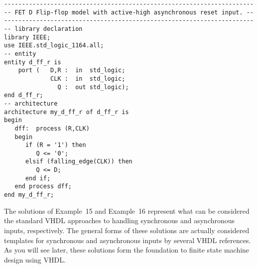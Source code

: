 \noindent
\begin{minipage}{0.99\linewidth}
\begin{lstlisting}[label=exe_16, caption=Solution to Example~16.]
----------------------------------------------------------------------
-- FET D Flip-flop model with active-high asynchronous reset input. --
----------------------------------------------------------------------
-- library declaration
library IEEE;
use IEEE.std_logic_1164.all;
-- entity
entity d_ff_r is
    port (   D,R :  in  std_logic;
             CLK :  in  std_logic;
               Q :  out std_logic);
end d_ff_r;
-- architecture
architecture my_d_ff_r of d_ff_r is
begin
   dff:  process (R,CLK)
   begin
      if (R = '1') then
         Q <= '0';
      elsif (falling_edge(CLK)) then
         Q <= D;
      end if;
   end process dff;
end my_d_ff_r;
\end{lstlisting}
\end{minipage}

The solutions of Example~15 and Example~16 represent what can be considered the standard VHDL approaches to handling synchronous and asynchronous inputs, respectively. The general forms of these solutions are actually considered templates for synchronous and asynchronous inputs by several VHDL references. As you will see later, these solutions form the foundation to finite state machine design using VHDL.

